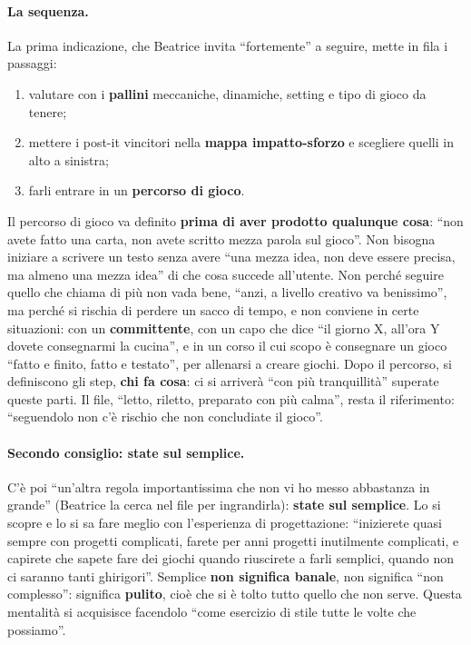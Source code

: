 \paragraph{La sequenza.} La prima indicazione, che Beatrice invita ``fortemente'' a
seguire, mette in fila i passaggi:
\begin{enumerate}
  \item valutare con i \textbf{pallini} meccaniche, dinamiche, setting e tipo di gioco
        da tenere;
  \item mettere i post-it vincitori nella \textbf{mappa impatto-sforzo} e scegliere
        quelli in alto a sinistra;
  \item farli entrare in un \textbf{percorso di gioco}.
\end{enumerate}
Il percorso di gioco va definito \textbf{prima di aver prodotto qualunque cosa}: ``non
avete fatto una carta, non avete scritto mezza parola sul gioco''. Non bisogna
iniziare a scrivere un testo senza avere ``una mezza idea, non deve essere precisa,
ma almeno una mezza idea'' di che cosa succede all'utente. Non perché seguire quello
che chiama di più non vada bene, ``anzi, a livello creativo va benissimo'', ma perché
si rischia di perdere un sacco di tempo, e non conviene in certe situazioni: con un
\textbf{committente}, con un capo che dice ``il giorno X, all'ora Y dovete
consegnarmi la cucina'', e in un corso il cui scopo è consegnare un gioco ``fatto e
finito, fatto e testato'', per allenarsi a creare giochi. Dopo il percorso, si
definiscono gli step, \textbf{chi fa cosa}: ci si arriverà ``con più tranquillità''
superate queste parti. Il file, ``letto, riletto, preparato con più calma'', resta il
riferimento: ``seguendolo non c'è rischio che non concludiate il gioco''.

\paragraph{Secondo consiglio: state sul semplice.} C'è poi ``un'altra regola
importantissima che non vi ho messo abbastanza in grande'' (Beatrice la cerca nel file
per ingrandirla): \textbf{state sul semplice}. Lo si scopre e lo si sa fare meglio
con l'esperienza di progettazione: ``inizierete quasi sempre con progetti
complicati, farete per anni progetti inutilmente complicati, e capirete che sapete
fare dei giochi quando riuscirete a farli semplici, quando non ci saranno tanti
ghirigori''. Semplice \textbf{non significa banale}, non significa ``non complesso'':
significa \textbf{pulito}, cioè che si è tolto tutto quello che non serve. Questa
mentalità si acquisisce facendolo ``come esercizio di stile tutte le volte che
possiamo''.

